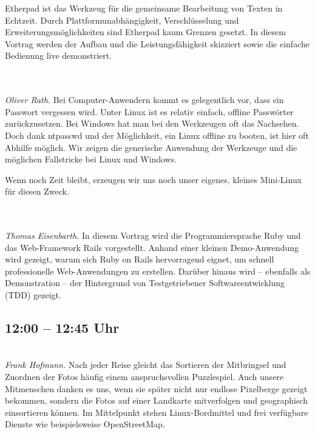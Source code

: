 \documentclass[10pt,a4paper,ngerman,landscape]{scrartcl}
\let\origdescription\description
\renewenvironment{description}{
  \setlength{\leftmargini}{0em}
  \origdescription
  \setlength{\itemindent}{0em}
  \setlength{\itemsep}{1.2em}
  \setlength{\labelsep}{\textwidth}
}
{\endlist}
\newcommand{\vorschub}{\mbox{}\\[-0.5em]}
\begin{document}
\begin{multicols}{3}
\begin{description}
Etherpad ist das Werkzeug für die gemeinsame Bearbeitung von Texten in Echtzeit.
Durch Plattformunabhängigkeit, Verschlüsselung und Erweiterungsmöglichkeiten
sind Etherpad kaum Grenzen gesetzt. In diesem Vortrag werden der Aufbau und die
Leistungsfähigkeit skizziert sowie die einfache Bedienung live
demonstriert.


\item[{\parbox[t]{\linewidth}{Windows- und Linux-Passwörter mit Minilinux zurücksetzen}}]\vorschub\\
\textsl{Oliver Rath.} Bei Computer-Anwendern kommt es gelegentlich vor, dass ein Passwort
vergessen wird. Unter Linux ist es relativ einfach, offline Passwörter
zurückzusetzen. Bei Windows hat man bei den Werkzeugen oft das Nachsehen.
Doch dank ntpasswd und der Möglichkeit, ein Linux offline zu booten, ist
hier oft Abhilfe möglich. Wir zeigen die generische Anwendung der Werkzeuge
und die möglichen Fallstricke bei Linux und Windows.

Wenn noch Zeit bleibt, erzeugen wir uns noch unser eigenes, kleines
Mini-Linux für diesen Zweck.

\item[{\parbox[t]{\linewidth}{Workshop: Schnelle Anwendungsentwicklung mit \mbox{Ruby} on Rails}}]\vorschub\\
\textsl{Thomas Eisenbarth.}
In diesem Vortrag wird die Programmiersprache Ruby und das Web-Framework
Rails vorgestellt. Anhand einer kleinen Demo-Anwendung wird gezeigt,
warum sich Ruby on Rails hervorragend eignet, um schnell professionelle
Web-Anwendungen zu erstellen. Darüber hinaus wird -- ebenfalls als
Demonstration -- der Hintergrund von Testgetriebener Softwareentwicklung
(TDD) gezeigt.

\end{description}

\subsection{12:00 -- 12:45 Uhr}
\begin{description}
\item[Geotagging. Fotos mit Geoinformationen verknüpfen]\vorschub
\textsl{Frank Hofmann.}
Nach jeder Reise gleicht das Sortieren der Mitbringsel und Zuordnen der Fotos
häufig einem anspruchsvollen Puzzlespiel. Auch unsere Mitmenschen danken es
uns, wenn sie später nicht nur endlose Pixelberge gezeigt bekommen, sondern die
Fotos auf einer Landkarte mitverfolgen und geographisch einsortieren können. Im
Mittelpunkt stehen Linux-Bordmittel und frei verfügbare Dienste wie
beispielsweise OpenStreetMap.




\end{description}
\end{multicols}
\end{document}
